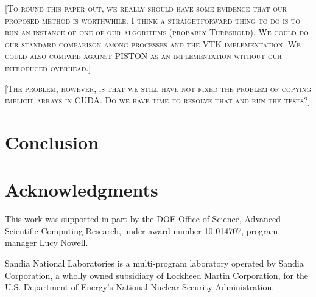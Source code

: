 \documentclass[conference]{IEEEtran}
\newcommand{\fix}[1]{{\color{red}\textsc{[#1]}}}
\begin{document}
\noindent
\fix{To round this paper out, we really should have some evidence that our
  proposed method is worthwhile.  I think a straightforward thing to do is
  to run an instance of one of our algorithms (probably Threshold).  We
  could do our standard comparison among processes and the VTK
  implementation.  We could also compare against PISTON as an
  implementation without our introduced overhead.}

\fix{The problem, however, is that we still have not fixed the problem of
  copying implicit arrays in CUDA.  Do we have time to resolve that and run
  the tests?}

\section{Conclusion}
\label{sec:Conclusion}

\noindent

\section*{Acknowledgments}

\noindent
This work was supported in part by the DOE Office of Science, Advanced
Scientific Computing Research, under award number 10-014707, program
manager Lucy Nowell.

Sandia National Laboratories is a multi-program laboratory operated by
Sandia Corporation, a wholly owned subsidiary of Lockheed Martin
Corporation, for the U.S. Department of Energy's National Nuclear Security
Administration.



\end{document}
